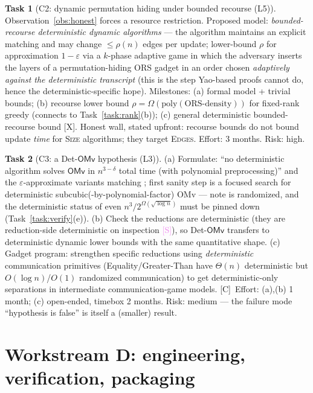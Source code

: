\documentclass[11pt]{article}
\theoremstyle{definition}
\newtheorem{task}{Task}
\theoremstyle{remark}
\newcommand{\statusS}{\textcolor{violet}{\textsf{[S]}}}
\newcommand{\statusC}{\textcolor{red!70!black}{\textsf{[C]}}}
\newcommand{\statusX}{\textcolor{red!70!black}{\textsf{[X]}}}
\newcommand{\ORS}{\mathrm{ORS}}
\newcommand{\OMv}{\mathsf{OMv}}
\newcommand{\eps}{\varepsilon}
\begin{document}
\begin{task}[C2: dynamic permutation hiding under bounded recourse (L5)]
\label{task:hiding}
Observation~\ref{obs:honest} forces a resource restriction. Proposed
model: \emph{bounded-recourse deterministic dynamic algorithms} --- the
algorithm maintains an explicit matching and may change $\le \rho(n)$
edges per update; lower-bound $\rho$ for approximation $1-\eps$ via a
$k$-phase adaptive game in which the adversary inserts the layers of a
permutation-hiding ORS gadget \cite{AS23} in an order chosen
\emph{adaptively against the deterministic transcript} (this is the step
Yao-based proofs cannot do, hence the deterministic-specific hope).
Milestones: (a) formal model + trivial bounds; (b) recourse lower bound
$\rho=\Omega(\text{poly}(\ORS\text{-density}))$ for fixed-rank greedy
(connects to Task~\ref{task:rank}(b)); (c) general deterministic
bounded-recourse bound \statusX. Honest wall, stated upfront: recourse
bounds do not bound update \emph{time} for \textsc{Size} algorithms;
they target \textsc{Edges}. Effort: 3 months. Risk: high.
\end{task}

\begin{task}[C3: a Det-$\OMv$ hypothesis (L3)]\label{task:detomv}
(a) Formulate: ``no deterministic algorithm solves $\OMv$ in
$n^{3-\delta}$ total time (with polynomial preprocessing)'' and the
$\eps$-approximate variants matching \cite{Liu24}; first sanity step is
a focused search for deterministic subcubic(-by-polynomial-factor) OMv
--- note \cite{LW17} is randomized, and the deterministic status of even
$n^3/2^{\Omega(\sqrt{\log n})}$ must be pinned down
(Task~\ref{task:verify}(e)).
(b) Check the \cite{HKNS15,Liu24} reductions are deterministic (they
are reduction-side deterministic on inspection \statusS), so Det-$\OMv$
transfers to deterministic dynamic lower bounds with the same
quantitative shape.
(c) Gadget program: strengthen specific reductions using
\emph{deterministic} communication primitives (Equality/Greater-Than
have $\Theta(n)$ deterministic but $O(\log n)$/$O(1)$ randomized
communication) to get deterministic-only separations in intermediate
communication-game models. \statusC\ Effort: (a),(b) 1 month; (c)
open-ended, timebox 2 months. Risk: medium --- the failure mode
``hypothesis is false'' is itself a (smaller) result.
\end{task}

\section{Workstream D: engineering, verification, packaging}
\label{sec:wsD}
\end{document}
